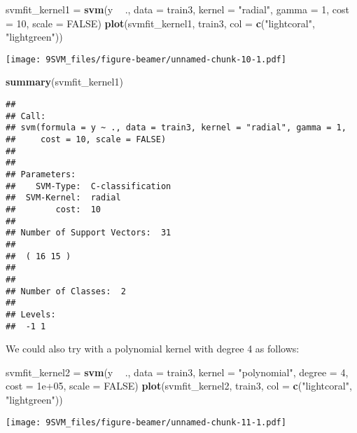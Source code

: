 \documentclass[10pt,ignorenonframetext,]{beamer}
\newenvironment{Shaded}{\begin{snugshade}}{\end{snugshade}}
\newcommand{\KeywordTok}[1]{\textcolor[rgb]{0.13,0.29,0.53}{\textbf{#1}}}
\newcommand{\DataTypeTok}[1]{\textcolor[rgb]{0.13,0.29,0.53}{#1}}
\newcommand{\DecValTok}[1]{\textcolor[rgb]{0.00,0.00,0.81}{#1}}
\newcommand{\FloatTok}[1]{\textcolor[rgb]{0.00,0.00,0.81}{#1}}
\newcommand{\StringTok}[1]{\textcolor[rgb]{0.31,0.60,0.02}{#1}}
\newcommand{\OtherTok}[1]{\textcolor[rgb]{0.56,0.35,0.01}{#1}}
\newcommand{\OperatorTok}[1]{\textcolor[rgb]{0.81,0.36,0.00}{\textbf{#1}}}
\newcommand{\NormalTok}[1]{#1}
\begin{document}
\begin{frame}[fragile]

\begin{Shaded}
\begin{Highlighting}[]
\NormalTok{svmfit_kernel1 =}\StringTok{ }\KeywordTok{svm}\NormalTok{(y }\OperatorTok{~}\StringTok{ }\NormalTok{., }\DataTypeTok{data =}\NormalTok{ train3, }\DataTypeTok{kernel =} \StringTok{"radial"}\NormalTok{, }\DataTypeTok{gamma =} \DecValTok{1}\NormalTok{, }
    \DataTypeTok{cost =} \DecValTok{10}\NormalTok{, }\DataTypeTok{scale =} \OtherTok{FALSE}\NormalTok{)}
\KeywordTok{plot}\NormalTok{(svmfit_kernel1, train3, }\DataTypeTok{col =} \KeywordTok{c}\NormalTok{(}\StringTok{"lightcoral"}\NormalTok{, }\StringTok{"lightgreen"}\NormalTok{))}
\end{Highlighting}
\end{Shaded}

\texttt{[image: 9SVM\_files/figure-beamer/unnamed-chunk-10-1.pdf]}

\begin{Shaded}
\begin{Highlighting}[]
\KeywordTok{summary}\NormalTok{(svmfit_kernel1)}
\end{Highlighting}
\end{Shaded}

\begin{verbatim}
## 
## Call:
## svm(formula = y ~ ., data = train3, kernel = "radial", gamma = 1, 
##     cost = 10, scale = FALSE)
## 
## 
## Parameters:
##    SVM-Type:  C-classification 
##  SVM-Kernel:  radial 
##        cost:  10 
## 
## Number of Support Vectors:  31
## 
##  ( 16 15 )
## 
## 
## Number of Classes:  2 
## 
## Levels: 
##  -1 1
\end{verbatim}

\normalsize

\end{frame}

\begin{frame}[fragile]

We could also try with a polynomial kernel with degree 4 as follows:

\footnotesize

\begin{Shaded}
\begin{Highlighting}[]
\NormalTok{svmfit_kernel2 =}\StringTok{ }\KeywordTok{svm}\NormalTok{(y }\OperatorTok{~}\StringTok{ }\NormalTok{., }\DataTypeTok{data =}\NormalTok{ train3, }\DataTypeTok{kernel =} \StringTok{"polynomial"}\NormalTok{, }
    \DataTypeTok{degree =} \DecValTok{4}\NormalTok{, }\DataTypeTok{cost =} \FloatTok{1e+05}\NormalTok{, }\DataTypeTok{scale =} \OtherTok{FALSE}\NormalTok{)}
\KeywordTok{plot}\NormalTok{(svmfit_kernel2, train3, }\DataTypeTok{col =} \KeywordTok{c}\NormalTok{(}\StringTok{"lightcoral"}\NormalTok{, }\StringTok{"lightgreen"}\NormalTok{))}
\end{Highlighting}
\end{Shaded}

\texttt{[image: 9SVM\_files/figure-beamer/unnamed-chunk-11-1.pdf]}

\end{frame}
\end{document}
